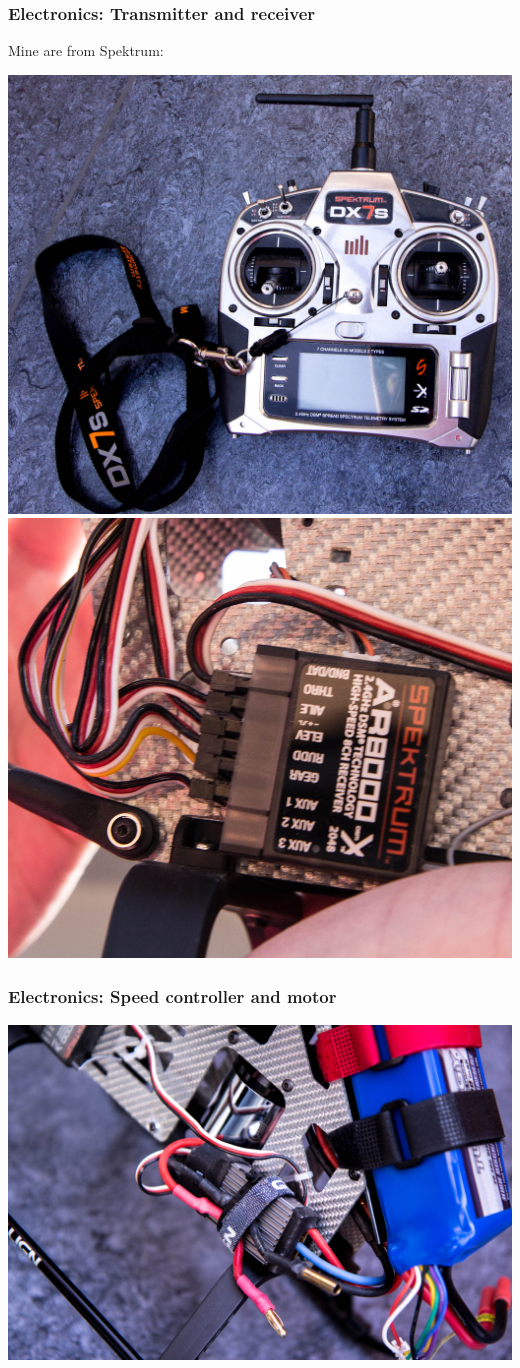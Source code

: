 \documentclass{beamer}
\begin{document}
\begin{frame}
\frametitle{Electronics: Transmitter and receiver}

Mine are from Spektrum:

\includegraphics[width=.5\textwidth]{images/IMG_0626_cropped_smaller}
\includegraphics[width=.5\textwidth]{images/IMG_0628_cropped_smaller}

\end{frame}

\begin{frame}
\frametitle{Electronics: Speed controller and motor}

\begin{center}
	\includegraphics[width=.9\textwidth]{images/IMG_0640_smaller}
\end{center}

\end{frame}
\end{document}
